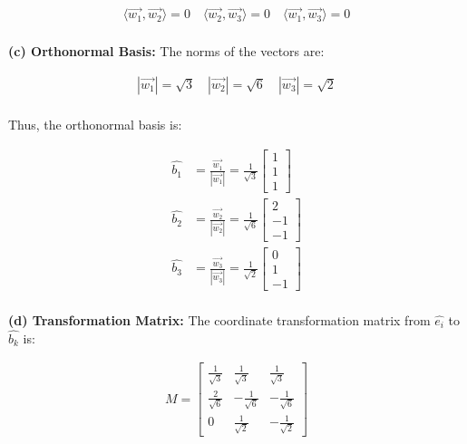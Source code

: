 \documentclass[letterpaper,11pt]{article}
\begin{document}
\begin{align*}
    \langle \vec{w_1}, \vec{w_2} \rangle = 0 \quad 
    \langle \vec{w_2}, \vec{w_3} \rangle = 0 \quad 
    \langle \vec{w_1}, \vec{w_3} \rangle = 0 \\
\end{align*}

\textbf{(c) Orthonormal Basis:}  
The norms of the vectors are:

\begin{align*}
    |\vec{w_1}| = \sqrt{3} \quad
    |\vec{w_2}| = \sqrt{6} \quad
    |\vec{w_3}| = \sqrt{2} \\
\end{align*}

Thus, the orthonormal basis is:

\begin{align*}
    \hat{b_1} &= \frac{\vec{w_1}}{|\vec{w_1}|} = \frac{1}{\sqrt{3}} \begin{bmatrix} 1 \\ 1 \\ 1 \end{bmatrix} \\
    \hat{b_2} &= \frac{\vec{w_2}}{|\vec{w_2}|} = \frac{1}{\sqrt{6}} \begin{bmatrix} 2 \\ -1 \\ -1 \end{bmatrix} \\
    \hat{b_3} &= \frac{\vec{w_3}}{|\vec{w_3}|} = \frac{1}{\sqrt{2}} \begin{bmatrix} 0 \\ 1 \\ -1 \end{bmatrix} \\
\end{align*}

\vspace{10pt}

\textbf{(d) Transformation Matrix:}  
The coordinate transformation matrix from $\hat{e_i}$ to $\hat{b_k}$ is:

\begin{align*}
    M =
    \begin{bmatrix}
        \frac{1}{\sqrt{3}} & \frac{1}{\sqrt{3}} & \frac{1}{\sqrt{3}} \\
        \frac{2}{\sqrt{6}} & -\frac{1}{\sqrt{6}} & -\frac{1}{\sqrt{6}} \\
        0 & \frac{1}{\sqrt{2}} & -\frac{1}{\sqrt{2}}
    \end{bmatrix}
\end{align*}
\end{document}
